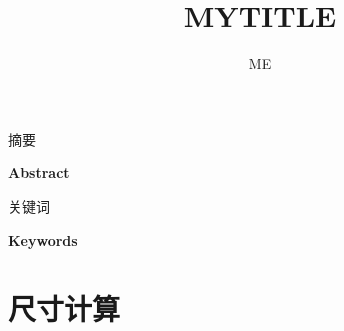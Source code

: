 \documentclass[UTF8,12px,a4paper]{ctexart} %
\title{MYTITLE}
\author{ME}
\numberwithin{equation}{section} %
\begin{document}
\maketitle
\thispagestyle{fancy} %
{\noindent \Large \heiti 摘要}\\
\par
{\noindent \Large \textbf{Abstract}}\\
\par
{\noindent \Large \heiti 关键词}\\
\par
{\noindent \Large \textbf{Keywords}}\\
\tableofcontents
\section{\heiti 尺寸计算}
\end{document}
